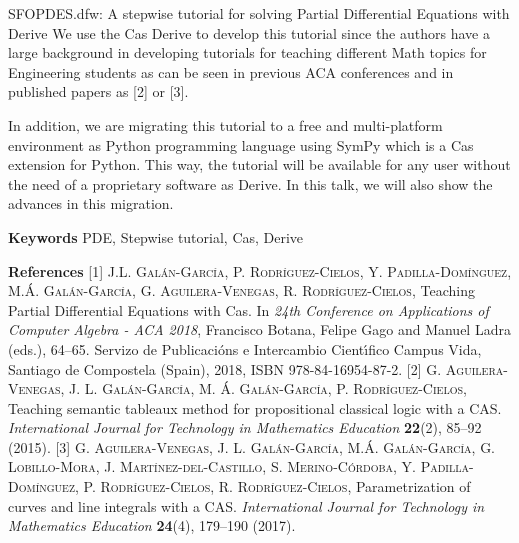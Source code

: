 \begin{abstract_online}{SFOPDES.dfw: A stepwise tutorial for solving Partial Differential Equations with {\sc Derive}}
We use the {\sc Cas Derive} to develop this tutorial since the authors have a large background in developing  tutorials for teaching different Math topics for Engineering students as can be seen in previous ACA conferences and in published papers as [2] or [3]. 

In addition, we are migrating this tutorial to a free and multi-platform environment as {\sc Python} programming language using {\sc SymPy} which is a {\sc Cas} extension for {\sc Python}. This way, the tutorial will be available for any user without the need of a proprietary software as {\sc Derive}. In this talk, we will also show the advances in this migration.

\textbf{Keywords} \newline{} PDE, Stepwise tutorial, {\sc Cas}, {\sc Derive}

\textbf{References} \newline{}
[1] \textsc{J.L. Gal\'an-Garc\'{\i}a, P. Rodr\'{\i}guez-Cielos, Y. Padilla-Dom\'{\i}nguez, M.\'A. Gal\'an-Garc\'{\i}a, G. Aguilera-Venegas, R. Rodr\'{\i}guez-Cielos}, Teaching Partial Differential Equations with {\sc Cas}. In \emph{24th Conference on Applications of Computer Algebra - ACA 2018}, Francisco Botana, Felipe Gago and Manuel Ladra (eds.), 64--65. Servizo de Publicaci\'ons e Intercambio Cient\'{\i}fico Campus Vida, Santiago de Compostela (Spain), 2018, ISBN 978-84-16954-87-2. \newline{}
[2] \textsc{G. Aguilera-Venegas, J. L. Gal\'an-Garc\'{\i}a, M. \'A. Gal\'an-Garc\'{\i}a, P. Rodr\'{\i}guez-Cielos}, Teaching semantic tableaux method for propositional classical logic with a CAS. \emph{International Journal for Technology in Mathematics Education} \textbf{22}(2), 85--92  (2015). \newline{}
[3] \textsc{G. Aguilera-Venegas, J. L. Gal\'an-Garc\'{\i}a, M.\'A. Gal\'an-Garc\'{\i}a, G. Lobillo-Mora, J.  Mart\'{\i}nez-del-Castillo, S. Merino-C\'ordoba, Y. Padilla-Dom\'{\i}nguez, P. Rodr\'{\i}guez-Cielos, R. Rodr\'{\i}guez-Cielos}, Parametrization of curves and line integrals with a CAS. \emph{International Journal for Technology in Mathematics Education} \textbf{24}(4), 179--190  (2017). \newline{}
\end{abstract_online}
    